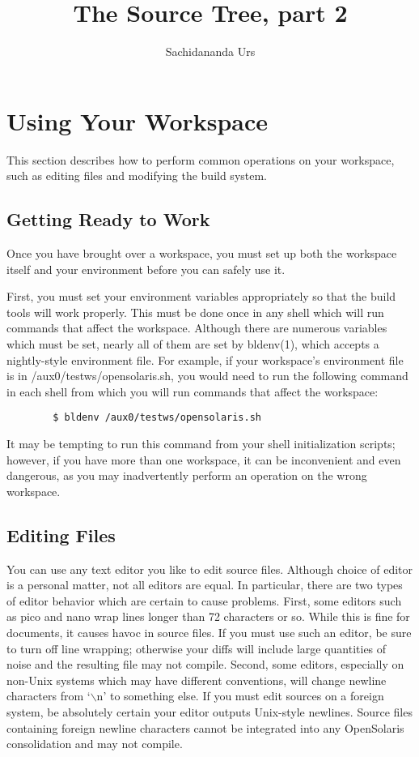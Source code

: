 \documentclass{article}
\title{The Source Tree, part 2}
\author{Sachidananda Urs}
\date{}
\begin{document}
\maketitle

\section*{Using Your Workspace}

This section describes how to perform common operations on your workspace, such
as editing files and modifying the build system.

\subsection*{Getting Ready to Work}

Once you have brought over a workspace, you must set up both the workspace
itself and your environment before you can safely use it.

First, you must set your environment variables appropriately so that the build
tools will work properly. This must be done once in any shell which will run
commands that affect the workspace. Although there are numerous variables which
must be set, nearly all of them are set by bldenv(1), which accepts a
nightly-style environment file. For example, if your workspace's environment
file is in /aux0/testws/opensolaris.sh, you would need to run the following
command in each shell from which you will run commands that affect the
workspace:

\begin{verbatim}
        $ bldenv /aux0/testws/opensolaris.sh
\end{verbatim}

\vspace{0.1cm}
It may be tempting to run this command from your shell initialization scripts;
however, if you have more than one workspace, it can be inconvenient and even
dangerous, as you may inadvertently perform an operation on the wrong
workspace.

\subsection*{Editing Files}

You can use any text editor you like to edit source files. Although choice of
editor is a personal matter, not all editors are equal. In particular, there
are two types of editor behavior which are certain to cause problems. First,
some editors such as pico and nano wrap lines longer than 72 characters or
so. While this is fine for documents, it causes havoc in source files. If you
must use such an editor, be sure to turn off line wrapping; otherwise your
diffs will include large quantities of noise and the resulting file may not
compile. Second, some editors, especially on non-Unix systems which may have
different conventions, will change newline characters from `$\backslash$n' to
something else. If you must edit sources on a foreign system, be absolutely
certain your editor outputs Unix-style newlines. Source files containing foreign
newline characters cannot be integrated into any OpenSolaris consolidation and
may not compile.
\end{document}
